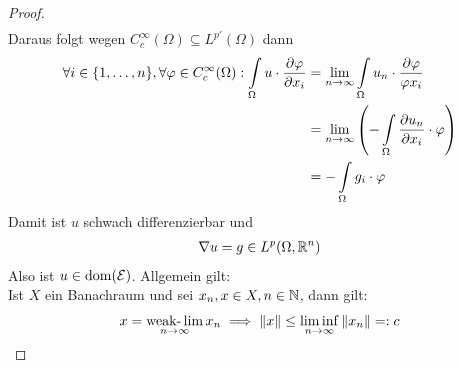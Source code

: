 \begin{beispiel}
\begin{proof}
\begin{align*}
		\end{align*}
		Daraus folgt wegen $C_c^\infty(\Omega)\subseteq L^{p'}(\Omega)$ dann
		\begin{align*}
			\forall i\in\lbrace1,\ldots,n\rbrace,\forall\varphi\in C_c ^\infty(\Omega):
			\int\limits_\Omega u\cdot\frac{\partial\varphi}{\partial x_i}
			&=\lim\limits_{n\to\infty}\int\limits_\Omega u_n\cdot\frac{\partial\varphi}{\varphi x_i}\\
			&=\lim\limits_{n\to\infty}\left(-\int\limits_\Omega\frac{\partial u_n}{\partial x_i}\cdot\varphi\right)\\
			&=-\int\limits_\Omega g_i\cdot\varphi
		\end{align*}
		Damit ist $u$ schwach differenzierbar und 
		\begin{align*}
			\nabla u=g\in L^p(\Omega,\mathbb{R}^n)
		\end{align*}
		Also ist $u\in\operatorname{dom}(\mathcal{E})$. Allgemein gilt:\\
		Ist $X$ ein Banachraum und sei $x_n,x\in X,n\in\mathbb{N}$, dann gilt:
		\begin{align*}
			x=\operatorname*{\text{weak-}\lim}\limits_{n\to\infty} x_n\implies\Vert x\Vert\leq\liminf\limits_{n\to\infty}\Vert x_n\Vert=:c
		\end{align*}
		

\end{proof}
\end{beispiel}
